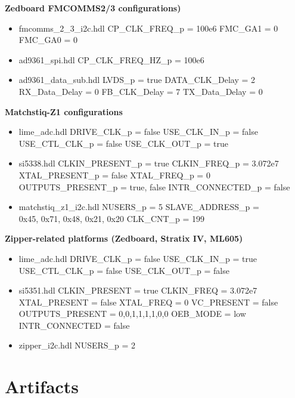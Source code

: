 \begin{appendices}
\begin{minipage}[t]{.5\textwidth}
	\textbf{Zedboard FMCOMMS2/3 configurations)}
	\begin{itemize}
		\item fmcomms\_2\_3\_i2c.hdl
			\subitem CP\_CLK\_FREQ\_p = 100e6
			\subitem FMC\_GA1 = 0
			\subitem FMC\_GA0 = 0
		\item ad9361\_spi.hdl
			\subitem CP\_CLK\_FREQ\_HZ\_p = 100e6
		\item ad9361\_data\_sub.hdl
			\subitem LVDS\_p = true
			\subitem DATA\_CLK\_Delay = 2
			\subitem RX\_Data\_Delay = 0
			\subitem FB\_CLK\_Delay = 7
			\subitem TX\_Data\_Delay = 0
	\end{itemize}
\end{minipage}
	\begin{minipage}[t]{.5\textwidth}
		\textbf{Matchstiq-Z1 configurations}
	\begin{itemize}
		\item lime\_adc.hdl
			\subitem DRIVE\_CLK\_p = false
			\subitem USE\_CLK\_IN\_p = false
			\subitem USE\_CTL\_CLK\_p = false
			\subitem USE\_CLK\_OUT\_p = true
		\item si5338.hdl
			\subitem CLKIN\_PRESENT\_p = true
			\subitem CLKIN\_FREQ\_p = 3.072e7
			\subitem XTAL\_PRESENT\_p = false
			\subitem XTAL\_FREQ\_p = 0
			\subitem OUTPUTS\_PRESENT\_p = true, false
			\subitem INTR\_CONNECTED\_p = false
		\item matchstiq\_z1\_i2c.hdl
			\subitem NUSERS\_p = 5
			\subitem SLAVE\_ADDRESS\_p = \\0x45, 0x71, 0x48, 0x21, 0x20
			\subitem CLK\_CNT\_p = 199
	\end{itemize}
		\textbf{Zipper-related platforms (Zedboard, Stratix IV, ML605)}
	\begin{itemize}
		\item lime\_adc.hdl
			\subitem DRIVE\_CLK\_p = false
			\subitem USE\_CLK\_IN\_p = true
			\subitem USE\_CTL\_CLK\_p = false
			\subitem USE\_CLK\_OUT\_p = false
		\item si5351.hdl
			\subitem CLKIN\_PRESENT = true
			\subitem CLKIN\_FREQ = 3.072e7
			\subitem XTAL\_PRESENT = false
			\subitem XTAL\_FREQ = 0
			\subitem VC\_PRESENT = false
			\subitem OUTPUTS\_PRESENT = 0,0,1,1,1,1,0,0
			\subitem OEB\_MODE = low
			\subitem INTR\_CONNECTED = false
		\item zipper\_i2c.hdl
			\subitem NUSERS\_p = 2
	\end{itemize}
	\end{minipage}
	\pagebreak
\section{Artifacts}
\label{app:Artifacts}

\end{appendices}

